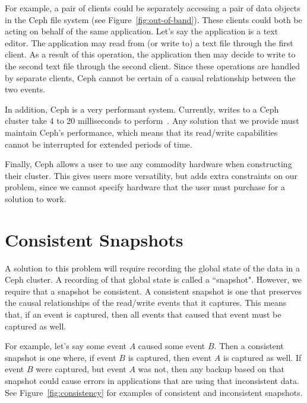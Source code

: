 For example, a pair of clients could be separately accessing a pair of data 
objects in the Ceph file system (see Figure~\ref{fig:out-of-band}). These clients could both be acting on behalf 
of the same application. Let's say the application is a text editor. The 
application may read from (or write to) a text file through the first client. 
As a result of this operation, the application then may decide to write to the 
second text file through the second client. Since these operations are handled 
by separate clients, Ceph cannot be certain of a causal relationship between 
the two events. 

In addition, Ceph is a very performant system. Currently, writes to a Ceph 
cluster take 4 to 20 milliseconds to perform~\citep{Sage}. Any solution that 
we provide must maintain Ceph's performance, which means that its read/write 
capabilities cannot be interrupted for extended periods of time.

Finally, Ceph allows a user to use any commodity hardware when constructing 
their cluster. This gives users more versatility, but adds extra constraints 
on our problem, since we cannot specify hardware that the user must purchase 
for a solution to work.

\section{Consistent Snapshots}

A solution to this problem will require recording the global state of the 
data in a Ceph cluster. A recording of that global state is called a 
``snapshot". However, we require that a snapshot be consistent. 
A consistent snapshot is one that preserves the causal relationships 
of the read/write events that it captures. This means that, if an 
event is captured, then all events that caused that 
event must be captured as well. 

For example, let's say some event $A$ caused some event $B$. 
Then a consistent snapshot 
is one where, if event $B$ is captured, then event $A$ is captured as well. If
event $B$ were captured, but event $A$ was not, then any backup based on that
snapshot could cause errors in applications that are using that inconsistent
data. See Figure~\ref{fig:consistency} for examples of consistent and 
inconsistent snapshots.

